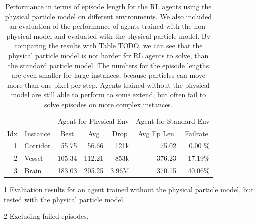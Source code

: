 \begin{table}[htp]
    \begin{center}
        \begin{threeparttable}
            \begin{tabular}{rlrrrrr}
                \toprule
                 &  & \multicolumn{3}{c}{Agent for Physical Env} & \multicolumn{2}{c}{Agent for Standard Env\tnote{1}} \\
                \cmidrule(lr){3-5} \cmidrule(lr){6-7}
                \multicolumn{1}{c}{Idx} & \multicolumn{1}{c}{Instance} & \multicolumn{1}{c}{Best} & \multicolumn{1}{c}{Avg} & \multicolumn{1}{c}{Drop} & \multicolumn{1}{c}{Avg Ep Len} & \multicolumn{1}{c}{Failrate} \\
                \midrule
                1 & Corridor & 55.75 & 56.66 & 121k & 75.02\tnote{2} & 0.00 \%\\
                2 & Vessel & 105.34 & 112.21 & 853k & 376.23\tnote{2} & 17.19\% \\
                3 & Brain & 183.03 & 205.25 & 3.96M & 370.15\tnote{2} & 40.06\% \\
                \bottomrule
            \end{tabular}
            \begin{tablenotes}
                \footnotesize
                \item[1] Evaluation results for an agent trained without the physical particle model, but tested with the physical particle model.
                \item[2] Excluding failed episodes.
            \end{tablenotes}
        \end{threeparttable}
        
    \end{center}
    \caption[Agent Performance on Environments with the Physical Particle Model]{Performance in terms of episode length for the RL agents using the physical particle model on different environments. We also included an evaluation of the performance of agents trained with the non-physical model and evaluated with the physical particle model. By comparing the results with Table TODO, we can see that the physical particle model is not harder for RL agents to solve, than the standard particle model. The numbers for the episode lengths are even smaller for large instances, because particles can move more than one pixel per step. Agents trained without the physical model are still able to perform to some extend, but often fail to solve episodes on more complex instances.} \label{tab:Eval/Physical}
\end{table}

